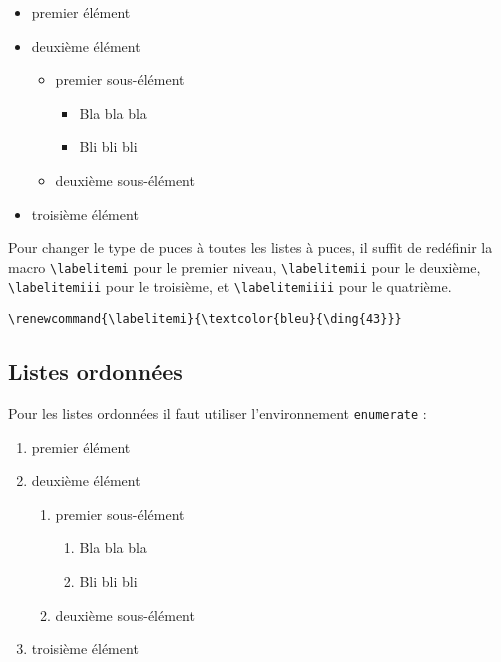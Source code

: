 \documentclass{rapport}
\begin{document}
        \begin{itemize}[label = ]
          \item premier élément
          \item deuxième élément
          \begin{itemize}[label = \textcolor{magenta}{}]
            \item premier sous-élément
            \begin{itemize}
              \item Bla bla bla
              \item Bli bli bli
            \end{itemize}
            \item deuxième sous-élément
          \end{itemize}
          \item troisième élément
        \end{itemize}
        
        Pour changer le type de puces à toutes les listes à puces, il suffit de redéfinir la macro \verb|\labelitemi| pour le premier niveau, \verb|\labelitemii| pour le deuxième, \verb|\labelitemiii| pour le troisième, et  \verb|\labelitemiiii| pour le quatrième.
        
        \begin{verbatim}
\renewcommand{\labelitemi}{\textcolor{bleu}{\ding{43}}}\end{verbatim}
        
      \subsection{Listes ordonnées}
        Pour les listes ordonnées il faut utiliser l'environnement \verb|enumerate| :
        
        \begin{enumerate}
          \item premier élément
          \item deuxième élément
          \begin{enumerate}
            \item premier sous-élément
            \begin{enumerate}
              \item Bla bla bla
              \item Bli bli bli
            \end{enumerate}
            \item deuxième sous-élément
          \end{enumerate}
          \item troisième élément
        \end{enumerate}
        
\end{document}
